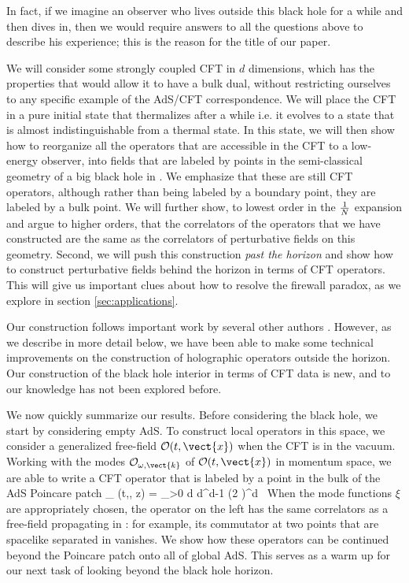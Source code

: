 In fact, if we imagine an observer who lives outside this black hole for a while and then dives in, then we would require answers to all the questions above to describe his experience; this is the reason for the title of our paper.

We will consider some strongly coupled CFT in $d$ dimensions, which has the properties that would allow it to have a bulk dual, without restricting ourselves to any specific example of the AdS/CFT correspondence. We will place the CFT in a pure initial state that thermalizes after a while i.e. it evolves to a state that is almost indistinguishable from a thermal state.  In this state, we will then show how to reorganize all the operators that are accessible in the CFT to a low-energy observer, into fields
 that are labeled by points in the semi-classical geometry of a big black hole in \ads[d+1]. We emphasize that these are still CFT operators, although rather than being labeled by a boundary point, they are labeled by a bulk point. We will further show, to lowest order in the ${1 \over N}$ expansion and argue to higher orders, that the correlators of the operators that we have constructed are the same as the correlators of perturbative fields on this geometry. Second, we will 
push this construction {\em past the horizon} and show how to construct perturbative fields behind the horizon in terms of CFT operators. This will give us important clues about how to resolve the firewall paradox, as we explore in section \ref{sec:applications}. 

Our construction follows important work by several other authors \cite{Banks:1998dd, Balasubramanian:1999ri, Bena:1999jv, Hamilton:2006fh,Hamilton:2006az,Hamilton:2005ju,Hamilton:2007wj,VanRaamsdonk:2009ar,VanRaamsdonk:2010pw,VanRaamsdonk:2011zz,Czech:2012bh,Heemskerk:2012mn}. However, as we describe in more detail below, we have been able to make some technical improvements on the construction of holographic operators outside the horizon. Our construction of the black hole interior in terms of CFT data is new, and to our knowledge has not been explored before.  

We now quickly summarize our results. Before considering the black hole, we start by considering empty AdS. To construct local operators in this space, we consider a generalized free-field \cite{ElShowk:2011ag} ${\cal O}(t, \vect{x})$ when the CFT is in the vacuum. Working with the modes ${\cal O}_{\omega,\vect{k}}$ of ${\cal O}(t, \vect{x})$ in  momentum space, we are able to write a CFT operator that is labeled by a point in the bulk of the AdS Poincare patch
\be
\label{cftpure}
\phi_{} (t,, z) = \int_{\omega>0} {d \omega d^{d-1}  \over (2 \pi)^d} \,
\ee
When the mode functions $\xi$ are appropriately chosen, the operator on the left has the same correlators as a free-field propagating in \ads[d+1]: for example, its commutator at two points that are spacelike separated in \ads[d+1] vanishes. We show how these operators can be continued beyond the Poincare patch onto all of global AdS. This serves as a warm up for our next task of looking beyond the black hole horizon. 

